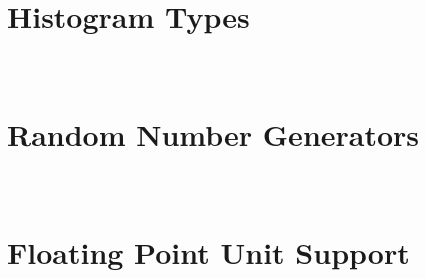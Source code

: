 \documentclass[hyperref]{manual}
\makeatletter
\let\py@OldOldChapter=\chapter
\renewcommand{\chapter}{\py@reset%
                        \py@OldOldChapter}
\makeatother
\begin{document}
\chapter[\protect\module{pygsl.histogram} --- Histogram Types]
{\protect{} \\ Histogram Types}
\label{cha:histogram-module}


\chapter[\protect\module{pygsl.rng} --- Random Number Generators]
{\protect{} \\ Random Number Generators}
\label{cha:rng-module}


%






\appendix

\chapter[\protect\module{pygsl.ieee} --- Floating Point Unit Support]
{\protect{} \\ Floating Point Unit Support}
\label{cha:ieee-module}


%





\end{document}

